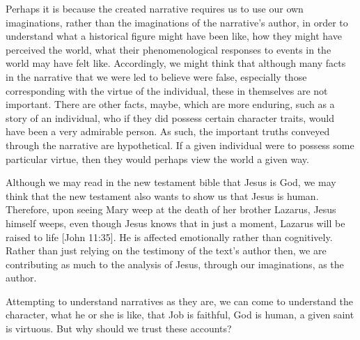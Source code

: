 \documentclass[
  letterpaper,
  DIV=11,
  numbers=noendperiod]{scrartcl}
\theoremstyle{remark}
\begin{document}
Perhaps it is because the created narrative requires us to use our own
imaginations, rather than the imaginations of the narrative's author, in
order to understand what a historical figure might have been like, how
they might have perceived the world, what their phenomenological
responses to events in the world may have felt like. Accordingly, we
might think that although many facts in the narrative that we were led
to believe were false, especially those corresponding with the virtue of
the individual, these in themselves are not important. There are other
facts, maybe, which are more enduring, such as a story of an individual,
who if they did possess certain character traits, would have been a very
admirable person. As such, the important truths conveyed through the
narrative are hypothetical. If a given individual were to possess some
particular virtue, then they would perhaps view the world a given way.

Although we may read in the new testament bible that Jesus is God, we
may think that the new testament also wants to show us that Jesus is
human. Therefore, upon seeing Mary weep at the death of her brother
Lazarus, Jesus himself weeps, even though Jesus knows that in just a
moment, Lazarus will be raised to life {[}John 11:35{]}. He is affected
emotionally rather than cognitively. Rather than just relying on the
testimony of the text's author then, we are contributing as much to the
analysis of Jesus, through our imaginations, as the author.

Attempting to understand narratives as they are, we can come to
understand the character, what he or she is like, that Job is faithful,
God is human, a given saint is virtuous. But why should we trust these
accounts?
\end{document}
